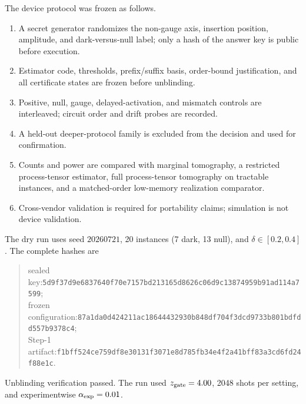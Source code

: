 \documentclass[aps,prl,onecolumn,superscriptaddress,nofootinbib]{revtex4-2}
\newcommand{\hashfour}[4]{\texttt{#1}\allowbreak\texttt{#2}\allowbreak\texttt{#3}\allowbreak\texttt{#4}}
\begin{document}
The device protocol was frozen as follows.
\begin{enumerate}
\item A secret generator randomizes the non-gauge axis, insertion position, amplitude, and dark-versus-null label; only a hash of the answer key is public before execution.
\item Estimator code, thresholds, prefix/suffix basis, order-bound justification, and all certificate states are frozen before unblinding.
\item Positive, null, gauge, delayed-activation, and mismatch controls are interleaved; circuit order and drift probes are recorded.
\item A held-out deeper-protocol family is excluded from the decision and used for confirmation.
\item Counts and power are compared with marginal tomography, a restricted process-tensor estimator, full process-tensor tomography on tractable instances, and a matched-order low-memory realization comparator.
\item Cross-vendor validation is required for portability claims; simulation is not device validation.
\end{enumerate}

The dry run uses seed $20260721$, 20 instances (7 dark, 13 null), and $\delta\in[0.2,0.4]$.  The complete hashes are
\begin{quote}\small\raggedright
sealed key:\quad \hashfour{5d9f37d9e6837640}{f70e7157bd213165}{d8626c06d9c13874}{959b91ad114a7599};\\
frozen configuration:\quad \hashfour{87a1da0d424211ac}{18644432930b848d}{f704f3dcd9733b80}{1bdfdd557b9378c4};\\
Step-1 artifact:\quad \hashfour{f1bff524ce759df8}{e30131f3071e8d78}{5fb34e4f2a41bff8}{3a3cd6fd24f88e1c}.
\end{quote}
Unblinding verification passed.  The run used $z_{\rm gate}=4.00$, 2048 shots per setting, and experimentwise $\alpha_{\rm exp}=0.01$.
\end{document}
